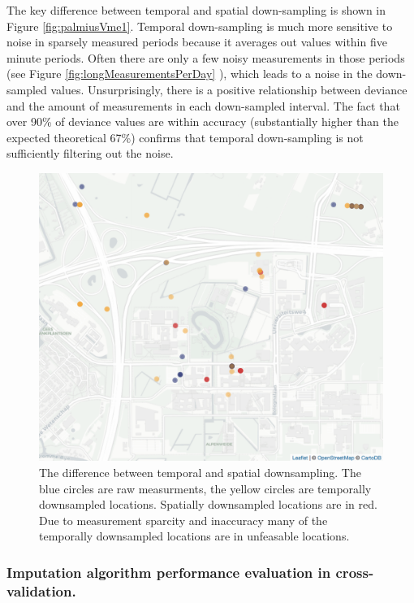 \documentclass[man]{apa6}
\theoremstyle{definition}
\theoremstyle{definition}
\theoremstyle{definition}
\theoremstyle{remark}
\begin{document}
The key difference between temporal and spatial down-sampling is shown
in Figure \ref{fig:palmiusVme1}. Temporal down-sampling is much more
sensitive to noise in sparsely measured periods because it averages out
values within five minute periods. Often there are only a few noisy
measurements in those periods (see Figure
\ref{fig:longMeasurementsPerDay} ), which leads to a noise in the
down-sampled values. Unsurprisingly, there is a positive relationship
between deviance and the amount of measurements in each down-sampled
interval. The fact that over 90\% of deviance values are within accuracy
(substantially higher than the expected theoretical 67\%) confirms that
temporal down-sampling is not sufficiently filtering out the noise.

\begin{figure}
\includegraphics[width=1\linewidth]{img/tempVsspace} \caption{The difference between temporal and spatial downsampling. The blue circles are raw measurments, the yellow circles are temporally downsampled locations. Spatially downsampled locations are in red. Due to measurement sparcity and inaccuracy many of the temporally downsampled locations are in unfeasable locations.}\label{fig:palmiusVsMe1}
\end{figure}

\subsubsection{Imputation algorithm performance evaluation in
cross-validation.}\label{imputation-algorithm-performance-evaluation-in-cross-validation.}
\end{document}
